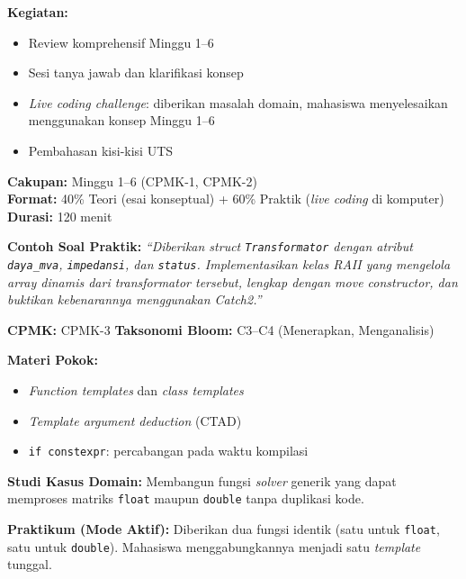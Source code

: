 \documentclass[12pt,a4paper]{article}
\begin{document}
\begin{tcolorbox}[colback=white, colframe=uniblue, title={\textbf{Minggu 7: Review \& Persiapan UTS}}, fonttitle=\bfseries\color{white}, coltitle=white, colbacktitle=uniblue]
\textbf{Kegiatan:}
\begin{itemize}[nosep]
    \item Review komprehensif Minggu 1--6
    \item Sesi tanya jawab dan klarifikasi konsep
    \item \textit{Live coding challenge}: diberikan masalah domain, mahasiswa menyelesaikan menggunakan konsep Minggu 1--6
    \item Pembahasan kisi-kisi UTS
\end{itemize}
\end{tcolorbox}

\begin{tcolorbox}[colback=lightgray, colframe=gray, title={\textbf{Minggu 8: UJIAN TENGAH SEMESTER (UTS)}}, fonttitle=\bfseries]
\textbf{Cakupan:} Minggu 1--6 (CPMK-1, CPMK-2) \\
\textbf{Format:} 40\% Teori (esai konseptual) + 60\% Praktik (\textit{live coding} di komputer) \\
\textbf{Durasi:} 120 menit

\textbf{Contoh Soal Praktik:}
\textit{``Diberikan struct \texttt{Transformator} dengan atribut \texttt{daya\_mva}, \texttt{impedansi}, dan \texttt{status}. Implementasikan kelas RAII yang mengelola array dinamis dari transformator tersebut, lengkap dengan move constructor, dan buktikan kebenarannya menggunakan Catch2.''}
\end{tcolorbox}

\begin{tcolorbox}[colback=white, colframe=uniblue, title={\textbf{Minggu 9: Pemrograman Generik \& \textit{Templates}}}, fonttitle=\bfseries\color{white}, coltitle=white, colbacktitle=uniblue]
\textbf{CPMK:} CPMK-3 \hfill \textbf{Taksonomi Bloom:} C3--C4 (Menerapkan, Menganalisis)

\textbf{Materi Pokok:}
\begin{itemize}[nosep]
    \item \textit{Function templates} dan \textit{class templates}
    \item \textit{Template argument deduction} (CTAD)
    \item \texttt{if constexpr}: percabangan pada waktu kompilasi
\end{itemize}

\textbf{Studi Kasus Domain:}
Membangun fungsi \textit{solver} generik yang dapat memproses matriks \texttt{float} maupun \texttt{double} tanpa duplikasi kode.

\textbf{Praktikum (Mode Aktif):}
Diberikan dua fungsi identik (satu untuk \texttt{float}, satu untuk \texttt{double}). Mahasiswa menggabungkannya menjadi satu \textit{template} tunggal.
\end{tcolorbox}
\end{document}
